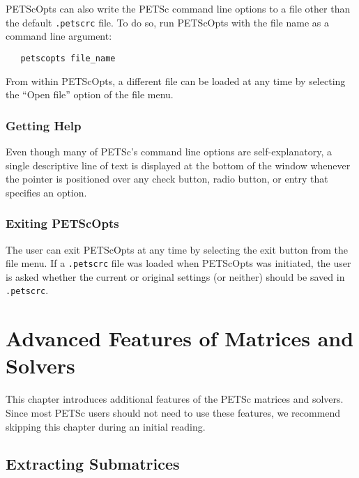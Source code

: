 {PETScOpts can also write the PETSc command line options to a file
other than the default {\tt .petscrc} file. To do so, run PETScOpts
with the file name as a command line argument:
\begin{verbatim}
   petscopts file_name
\end{verbatim}
From within PETScOpts, a different file can be loaded at any time
by selecting the ``Open file'' option of the file menu.

\subsection{Getting Help}

Even though many of PETSc's command line options are self-explanatory,
a single descriptive line of text is displayed at the bottom of the
window whenever the pointer is positioned over any check button, radio
button, or entry that specifies an option.

\subsection{Exiting PETScOpts}

The user can exit PETScOpts at any time by selecting the exit
button from the file menu.  If a {\tt .petscrc} file was loaded when
PETScOpts was initiated, the user is asked whether the current or
original settings (or neither) should be saved in {\tt .petscrc}.


\chapter{Advanced Features of Matrices and Solvers}
\label{ch:advanced}

This chapter introduces additional features of the PETSc matrices and solvers.
Since most PETSc users should not need to use these features, 
we recommend skipping this chapter during an initial reading.

\medskip \medskip

\section{Extracting Submatrices} 

}
